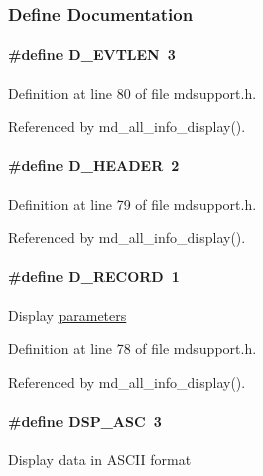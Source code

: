\subsubsection{Define Documentation}
\paragraph[{D\_\-EVTLEN}]{\setlength{\rightskip}{0pt plus 5cm}\#define D\_\-EVTLEN~3}\hfill\label{group__mdsupportdefineh_ga3ca85910f39037dcb031571d75d0fedc}


Definition at line 80 of file mdsupport.h.

Referenced by md\_\-all\_\-info\_\-display().
\paragraph[{D\_\-HEADER}]{\setlength{\rightskip}{0pt plus 5cm}\#define D\_\-HEADER~2}\hfill\label{group__mdsupportdefineh_gafb32f9ec171fac7ce0a9c7b68236e21a}


Definition at line 79 of file mdsupport.h.

Referenced by md\_\-all\_\-info\_\-display().
\paragraph[{D\_\-RECORD}]{\setlength{\rightskip}{0pt plus 5cm}\#define D\_\-RECORD~1}\hfill\label{group__mdsupportdefineh_ga3690d638414357c1bd39dd1bcaff5c38}
Display \hyperlink{structparameters}{parameters} 

Definition at line 78 of file mdsupport.h.

Referenced by md\_\-all\_\-info\_\-display().
\paragraph[{DSP\_\-ASC}]{\setlength{\rightskip}{0pt plus 5cm}\#define DSP\_\-ASC~3}\hfill\label{group__mdsupportdefineh_gaceb9fcfcef4f3ecba198a88fc503ccca}
Display data in ASCII format 

